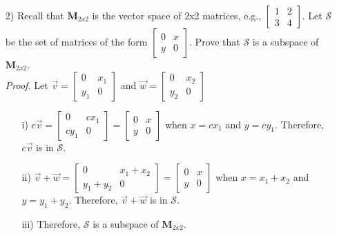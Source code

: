\documentclass[12pt,pdftex]{article}
\begin{document}
\begin{itemize}
\item[2)] Recall that $\mathbf{M}_{2x2}$ is the vector space of 2x2 matrices, e.g., $\left[\begin{array}{cc} 1 & 2\\ 3 & 4\end{array}\right]$.  Let $\mathcal{S}$ be the set of matrices of the form $\left[\begin{array}{cc} 0 & x\\ y & 0\end{array}\right]$. Prove that $\mathcal{S}$ is a subspace of $\mathbf{M}_{2x2}$. \\
\textit{Proof.} Let $\vec{v}=\left[\begin{array}{cc} 0 & x_1\\ y_1 & 0\end{array}\right]$
and $\vec{w} = \left[\begin{array}{cc} 0 & x_2\\ y_2 & 0\end{array}\right]$
	\begin{itemize}
	\item[i)] $c\vec{v}=\left[\begin{array}{cc} 0 & cx_1\\ cy_1 & 0\end{array}\right] =
    \left[\begin{array}{cc} 0 & x\\ y & 0\end{array}\right]$ when $x=cx_1$ and $y=cy_1$. Therefore, $c\vec{v}$ is in $\mathcal{S}$.
    \item[ii)] $\vec{v}+\vec{w}=\left[\begin{array}{cc} 0 & x_1+x_2\\ y_1+y_2 & 0\end{array}\right]=
    \left[\begin{array}{cc} 0 & x\\ y & 0\end{array}\right]$ when $x=x_1+x_2$ and $y=y_1+y_2$. Therefore, $\vec{v}+\vec{w}$ is in $\mathcal{S}$.
    \item[iii)] Therefore, $\mathcal{S}$ is a subspace of $\mathbf{M}_{2x2}$.
	\end{itemize}

\end{itemize}
\end{document}
